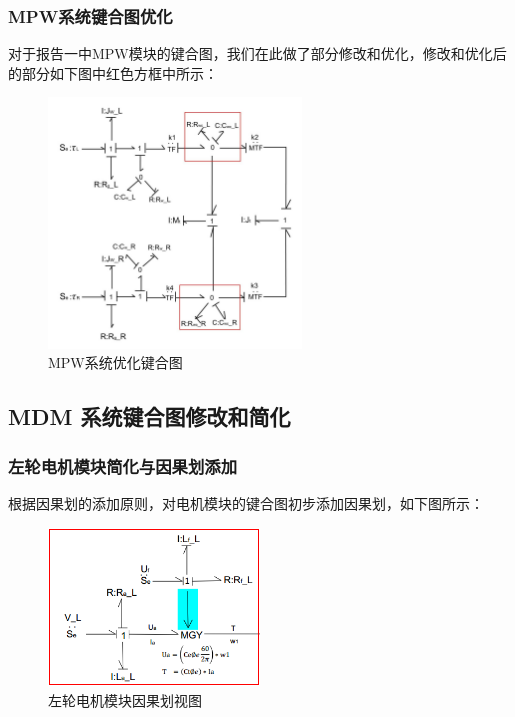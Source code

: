 \subsubsection{MPW系统键合图优化}

对于报告一中MPW模块的键合图，我们在此做了部分修改和优化，修改和优化后的部分如下图中红色方框中所示：
\begin{figure}[H]
	\centering
	\includegraphics[width=0.6\textwidth]{fig/bond/MPW2.png}
	\caption{MPW系统优化键合图}\label{fig:MPW2}
\end{figure}

\subsection{MDM 系统键合图修改和简化}

\subsubsection{左轮电机模块简化与因果划添加}

根据因果划的添加原则，对电机模块的键合图初步添加因果划，如下图所示：
\begin{figure}[H]
	\centering
	\includegraphics[width=0.5\textwidth]{fig/bond/MDM1.png}
	\caption{左轮电机模块因果划视图}\label{fig:bond_MDM1}
\end{figure}

